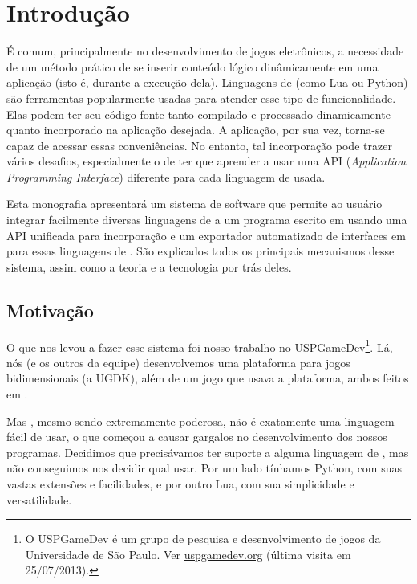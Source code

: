 
\chapter{Introdução}
\label{sec:intr}

É comum, principalmente no desenvolvimento de jogos eletrônicos, a necessidade
de um método prático de se inserir conteúdo lógico dinâmicamente em uma
aplicação (isto é, durante a execução dela). Linguagens de \script{} (como Lua ou
Python) são ferramentas popularmente usadas para atender esse tipo de
funcionalidade. Elas podem ter seu código fonte tanto compilado e processado
dinamicamente quanto incorporado na aplicação desejada. A aplicação, por sua
vez, torna-se capaz de acessar essas conveniências. No entanto, tal incorporação
pode trazer vários desafios, especialmente o de ter que aprender a usar uma API
(\textit{Application Programming Interface}) diferente para cada linguagem de
\script{} usada.

Esta monografia apresentará um sistema de software que permite ao usuário
integrar facilmente diversas linguagens de \script{} a um programa escrito em
\CXX{} usando uma API unificada para incorporação e um exportador
automatizado de interfaces em \CXX{} para essas linguagens de \script{}. São
explicados todos os principais mecanismos desse sistema, assim como a teoria e a
tecnologia por trás deles.

\section{Motivação}
\label{sec:intr:motivacao}
O que nos levou a fazer esse sistema foi nosso trabalho no USPGameDev\footnote{
  O USPGameDev é um grupo de pesquisa e desenvolvimento de jogos da
  Universidade de São Paulo. Ver \url{uspgamedev.org} (última visita 
  em 25/07/2013).
}.
Lá, nós (e os outros da equipe) desenvolvemos uma plataforma para jogos
bidimensionais (a UGDK\footnotemark), além de um jogo que usava a plataforma, ambos feitos em \CXX{}.


Mas \CXX{}, mesmo sendo extremamente poderosa, não é exatamente uma linguagem
fácil de usar, o que começou a causar gargalos no desenvolvimento
dos nossos programas. Decidimos que precisávamos ter suporte a alguma linguagem
de \script{}, mas não conseguimos nos decidir qual usar. Por um lado tínhamos
Python, com suas vastas extensões e facilidades, e por outro Lua, com sua
simplicidade e versatilidade.

